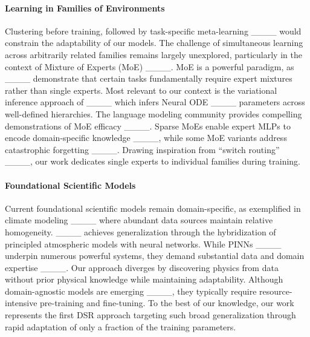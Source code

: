 \paragraph{Learning in Families of Environments} Clustering before training, followed by task-specific meta-learning ____ would constrain the adaptability of our models. The challenge of simultaneous learning across arbitrarily related families remains largely unexplored, particularly in the context of Mixture of Experts (MoE) ____. MoE is a powerful paradigm, as ____ demonstrate that certain tasks fundamentally require expert mixtures rather than single experts. Most relevant to our context is the variational inference approach of ____ which infers Neural ODE ____ parameters across well-defined hierarchies. The language modeling community provides compelling demonstrations of MoE efficacy ____. Sparse MoEs enable expert MLPs to encode domain-specific knowledge ____, while some MoE variants address catastrophic forgetting ____. Drawing inspiration from ``switch routing'' ____, our work dedicates single experts to individual families during training.

\paragraph{Foundational Scientific Models} Current foundational scientific models remain domain-specific, as exemplified in climate modeling ____ where abundant data sources maintain relative homogeneity. ____ achieves generalization through the hybridization of principled atmospheric models with neural networks. While PINNs ____ underpin numerous powerful systems, they demand substantial data and domain expertise ____. Our approach diverges by discovering physics from data without prior physical knowledge while maintaining adaptability. Although domain-agnostic models are emerging ____, they typically require resource-intensive pre-training and fine-tuning. To the best of our knowledge, our work represents the first DSR approach targeting such broad generalization through rapid adaptation of only a fraction of the training parameters.









